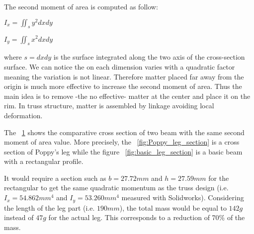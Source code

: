 The second moment of area is computed as follow:

\begin{center}
    $I_x = \iint_s y^2 dxdy$

    $I_y = \iint_s x^2 dxdy$
\end{center}

where $s = dxdy$ is the surface integrated along the two axis of the cross-section surface. We can notice the  on each dimension varies with a quadratic factor meaning the variation is not linear. Therefore matter placed far away from the origin is much more effective to increase the second moment of area.
Thus the main idea is to remove -the no effective- matter at the center and place it on the rim. In truss structure, matter is assembled by linkage avoiding local deformation.

The \figurename~\ref{fig:leg_section} shows the comparative cross section of two beam with the same second moment of area value. More precisely, the \figurename~\ref{fig:Poppy_leg_section} is a cross section of Poppy's leg while the figure \figurename~\ref{fig:basic_leg_section} is a basic beam with a rectangular profile.

\begin{figure}[!h]
\centering
    \hfil
    \caption{}
    \label{fig:leg_section}
\end{figure}

It would require a section such as $b=27.72 mm$ and $h=27.59 mm$ for the rectangular to get the same quadratic momentum as the truss design (i.e. $I_x = 54.862 mm^4$ and $I_y = 53.260 mm^4$ measured with Solidworks).
Considering the length of the leg part (i.e. $190 mm$), the total mass would be equal to $142 g$ instead of $47 g$ for the actual leg. This corresponds to a reduction of 70\% of the mass.

\begin{figure}[!h]
\centering


    \caption{}
    \label{fig:poppy_truss_structure}
\end{figure}

